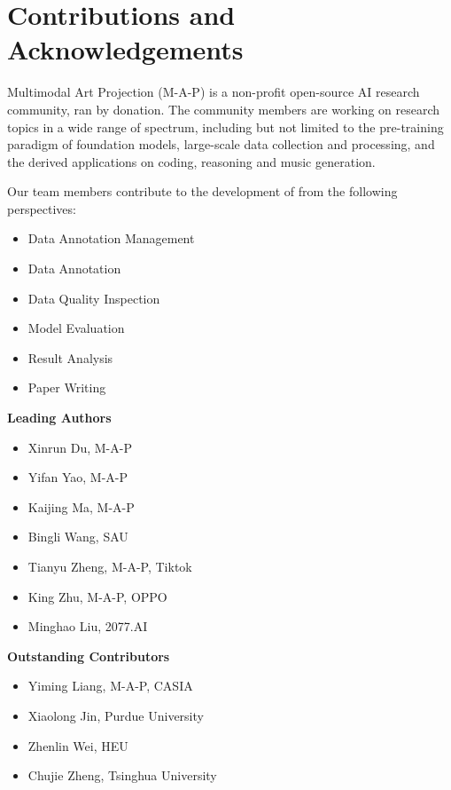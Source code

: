 \section{Contributions and Acknowledgements}

Multimodal Art Projection (M-A-P) is a non-profit open-source AI research community, ran by donation.
The community members are working on research topics in a wide range of spectrum, including but not limited to the pre-training paradigm of foundation models, large-scale data collection and processing, and the derived applications on coding, reasoning and music generation.

Our team members contribute to the development of \benchmark from the following perspectives: 
\begin{multicols}{2}
\begin{itemize}
    \item Data Annotation Management
    \item Data Annotation
    \item Data Quality Inspection
    \item Model Evaluation
    \item Result Analysis
    \item Paper Writing
\end{itemize}
\end{multicols}

\textbf{Leading Authors}
\begin{multicols}{2}
    \begin{itemize}
        \item Xinrun Du, M-A-P
        \item Yifan Yao, M-A-P
        \item Kaijing Ma, M-A-P
        \item Bingli Wang, SAU
        \item Tianyu Zheng, M-A-P, Tiktok
                \item King Zhu, M-A-P, OPPO
        \item Minghao Liu, 2077.AI
    \end{itemize}
\end{multicols}

\textbf{Outstanding Contributors}
\begin{multicols}{2}
    \begin{itemize}
        \item Yiming Liang, M-A-P, CASIA
        \item Xiaolong Jin, Purdue University
        \item Zhenlin Wei, HEU
        \item Chujie Zheng, Tsinghua University
    \end{itemize}
\end{multicols}

